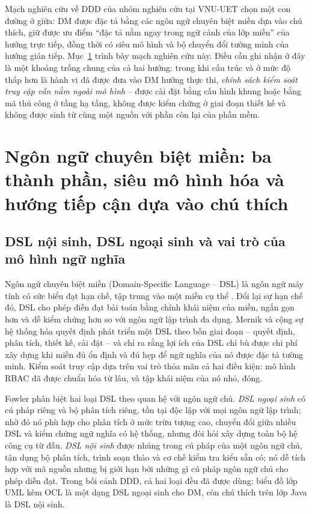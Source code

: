 Mạch nghiên cứu về DDD của nhóm nghiên cứu tại VNU-UET \cite{le2018dcsl,le2020,dang2023agl,le2025udml} chọn một con đường ở giữa: DM được đặc tả bằng các ngôn ngữ chuyên biệt miền dựa vào chú thích, giữ được ưu điểm ``đặc tả nằm ngay trong ngữ cảnh của lớp miền'' của hướng trực tiếp, đồng thời có siêu mô hình và bộ chuyển đổi tường minh của hướng gián tiếp. Mục~\ref{sec:dsl} trình bày mạch nghiên cứu này. Điều cần ghi nhận ở đây là một khoảng trống chung của cả hai hướng: trong khi cấu trúc và ở mức độ thấp hơn là hành vi đã được đưa vào DM hướng thực thi, \emph{chính sách kiểm soát truy cập vẫn nằm ngoài mô hình} -- được cài đặt bằng cấu hình khung hoặc bằng mã thủ công ở tầng hạ tầng, không được kiểm chứng ở giai đoạn thiết kế và không được sinh từ cùng một nguồn với phần còn lại của phần mềm.

\section{Ngôn ngữ chuyên biệt miền: ba thành phần, siêu mô hình hóa và hướng tiếp cận dựa vào chú thích}
\label{sec:dsl}

\subsection{DSL nội sinh, DSL ngoại sinh và vai trò của mô hình ngữ nghĩa}

Ngôn ngữ chuyên biệt miền (Domain-Specific Language -- DSL) là ngôn ngữ máy tính có sức biểu đạt hạn chế, tập trung vào một miền cụ thể \cite{fowler2010,mernik2005}. Đổi lại sự hạn chế đó, DSL cho phép diễn đạt bài toán bằng chính khái niệm của miền, ngắn gọn hơn và dễ kiểm chứng hơn so với ngôn ngữ lập trình đa dụng. Mernik và cộng sự \cite{mernik2005} hệ thống hóa quyết định phát triển một DSL theo bốn giai đoạn -- quyết định, phân tích, thiết kế, cài đặt -- và chỉ ra rằng lợi ích của DSL chỉ bù được chi phí xây dựng khi miền đủ ổn định và đủ hẹp để ngữ nghĩa của nó được đặc tả tường minh. Kiểm soát truy cập dựa trên vai trò thỏa mãn cả hai điều kiện: mô hình RBAC đã được chuẩn hóa từ lâu, và tập khái niệm của nó nhỏ, đóng.

Fowler \cite{fowler2010} phân biệt hai loại DSL theo quan hệ với ngôn ngữ chủ. \emph{DSL ngoại sinh} có cú pháp riêng và bộ phân tích riêng, tồn tại độc lập với mọi ngôn ngữ lập trình; nhờ đó nó phù hợp cho phân tích ở mức trừu tượng cao, chuyển đổi giữa nhiều DSL và kiểm chứng ngữ nghĩa có hệ thống, nhưng đòi hỏi xây dựng toàn bộ hệ công cụ từ đầu. \emph{DSL nội sinh} được nhúng trong cú pháp của một ngôn ngữ chủ, tận dụng bộ phân tích, trình soạn thảo và cơ chế kiểm tra kiểu sẵn có; nó dễ tích hợp với mã nguồn nhưng bị giới hạn bởi những gì cú pháp ngôn ngữ chủ cho phép diễn đạt. Trong bối cảnh DDD, cả hai loại đều đã được dùng: biểu đồ lớp UML kèm OCL là một dạng DSL ngoại sinh cho DM, còn chú thích trên lớp Java là DSL nội sinh.

